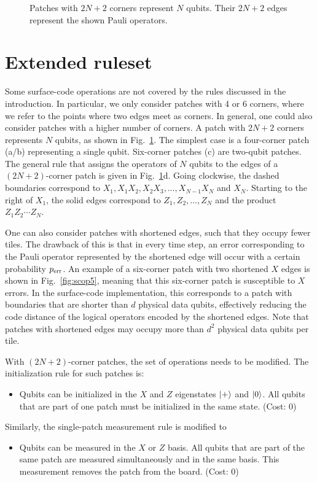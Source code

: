 \documentclass[prx,aps,letterpaper,twocolumn,allowfontchageintitle=true,accepted=2019-02-01]{quantumarticle}
\begin{document}
\begin{figure}[b!]
\centering
\def\svgwidth{\linewidth}

\caption{Patches with $2N+2$ corners represent $N$ qubits. Their $2N+2$ edges represent the shown Pauli operators.}
\label{fig:oldpatches}
\end{figure}



\section{Extended ruleset}
\label{app:extendedrules}

Some surface-code operations are not covered by the rules discussed in the introduction. In particular, we only consider patches with 4 or 6 corners, where we refer to the points where two edges meet as corners. In general, one could also consider patches with a higher number of corners.
A patch with $2N+2$ corners represents $N$ qubits, as shown in Fig.~\ref{fig:oldpatches}. 
The simplest case is a four-corner patch (a/b) representing a single qubit. Six-corner patches (c) are two-qubit patches. The general rule that assigns the operators of $N$ qubits to the edges of a $(2N+2)$-corner patch is given in Fig.~\ref{fig:oldpatches}d. Going clockwise, the dashed boundaries correspond to $X_1, X_1X_2, X_2X_3, \dots, X_{N-1}X_N$ and $X_N$. Starting to the right of $X_1$, the solid edges correspond to $Z_1, Z_2, \dots, Z_N$ and the product $Z_1Z_2\cdots Z_N$.



One can also consider patches with shortened edges, such that they occupy fewer tiles. The drawback of this is that in every time step, an error corresponding to the Pauli operator represented by the shortened edge will occur with a certain probability $p_{\rm err}$. An example of a six-corner patch with two shortened $X$ edges is shown in Fig.~\ref{fig:scop5}, meaning that this six-corner patch is susceptible to $X$ errors. In the surface-code implementation, this corresponds to a patch with boundaries that are shorter than $d$ physical data qubits, effectively reducing the code distance of the logical operators encoded by the shortened edges. Note that patches with shortened edges may occupy more than $d^2$ physical data qubits per tile. 




With $(2N+2)$-corner patches, the set of operations needs to be modified. The initialization rule for such patches is:
\begin{itemize}
 	\item[--] Qubits can be initialized in the $X$ and $Z$ eigenstates $\ket{+}$ and $\ket{0}$. All qubits that are part of one patch must be initialized in the same state. (Cost: 0\clock)
\end{itemize}
Similarly, the single-patch measurement rule is modified to
\begin{itemize}
\item[--] Qubits can be measured in the $X$ or $Z$ basis. All qubits that are part of the same patch are measured simultaneously and in the same basis. This measurement removes the patch from the board. (Cost: 0\clock)
\end{itemize}
\end{document}
